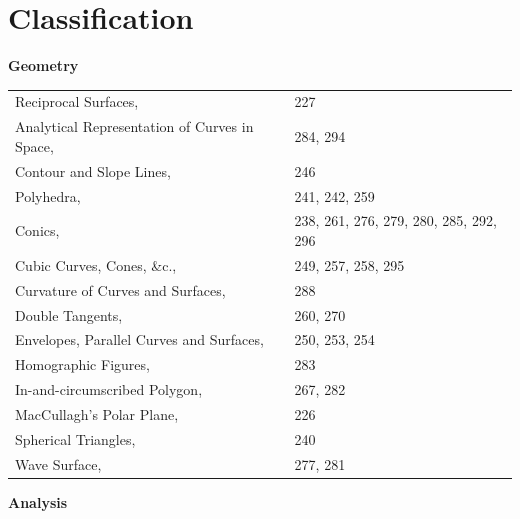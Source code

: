 \documentclass[11pt,a4paper]{book}
\begin{document}
\chapter*{Classification}
\thispagestyle{empty}

\textbf{Geometry}

\begin{tabular}{@{}p{2.5in}l@{}}
Reciprocal Surfaces, & 227 \\
Analytical Representation of Curves in Space, & 284, 294 \\
Contour and Slope Lines, & 246 \\
Polyhedra, & 241, 242, 259 \\
Conics, & 238, 261, 276, 279, 280, 285, 292, 296 \\
Cubic Curves, Cones, \&c., & 249, 257, 258, 295 \\
Curvature of Curves and Surfaces, & 288 \\
Double Tangents, & 260, 270 \\
Envelopes, Parallel Curves and Surfaces, & 250, 253, 254 \\
Homographic Figures, & 283 \\
In-and-circumscribed Polygon, & 267, 282 \\
MacCullagh's Polar Plane, & 226 \\
Spherical Triangles, & 240 \\
Wave Surface, & 277, 281 \\
\end{tabular}

\vspace{1em}
\textbf{Analysis}
\end{document}
